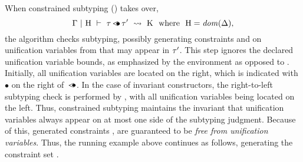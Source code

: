 When constrained subtyping () takes over,
\[ \Gamma~\vert~\mathrm{H}\ \vdash\ \tau \operatorname{\lessdot\!\!\bullet} \tau'\ \rightsquigarrow\ \mathrm{K}\ \text{ where }\ \mathrm{H} = \operatorname{\mathit{dom}}(\Delta), \]
the algorithm checks subtyping, possibly generating constraints 
\ctrsub{\tylb}{\va} and \ctrsub{\va}{\tyub} on
unification variables \va from \UEnvD that may appear in $\tau'$.
This step ignores the declared unification variable bounds,
as emphasized by the environment \UEnvD as opposed to \UEnv.
Initially, all unification variables are located on the right,
which is indicated with $\bullet$ on the right of~$\operatorname{\lessdot\!\!\bullet}$.
In the case of invariant constructors, the right-to-left subtyping check
is performed by , with all unification variables
being located on the left.
Thus, constrained subtyping maintains the invariant that unification
variables always appear on at most one side of the subtyping judgment.
Because of this, generated constraints \tylb, \tyub are guaranteed to be 
\emph{free from unification variables}.
Thus, the running example above continues as follows,
generating the constraint set {\ctrset{\ctrsub{\vx}{\va}, \ctrsub{\va}{\vx}}}.

